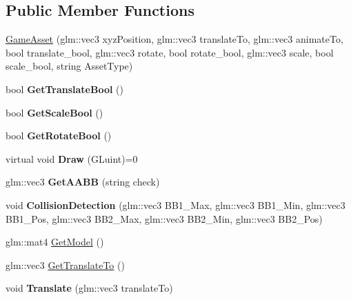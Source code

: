 \subsection*{Public Member Functions}
\begin{DoxyCompactItemize}
\item 
\hyperlink{class_game_asset_a9de932075d9b4263e7fb24fbfd163a61}{Game\+Asset} (glm\+::vec3 xyz\+Position, glm\+::vec3 translate\+To, glm\+::vec3 animate\+To, bool translate\+\_\+bool, glm\+::vec3 rotate, bool rotate\+\_\+bool, glm\+::vec3 scale, bool scale\+\_\+bool, string Asset\+Type)
\item 
\hypertarget{class_game_asset_af74bc1c4f6b87a4843217637b75290d4}{}bool {\bfseries Get\+Translate\+Bool} ()\label{class_game_asset_af74bc1c4f6b87a4843217637b75290d4}

\item 
\hypertarget{class_game_asset_ae0a76a50ff3c6c119852c195053c9a38}{}bool {\bfseries Get\+Scale\+Bool} ()\label{class_game_asset_ae0a76a50ff3c6c119852c195053c9a38}

\item 
\hypertarget{class_game_asset_a9fb9187dfca6160898344e79d41de224}{}bool {\bfseries Get\+Rotate\+Bool} ()\label{class_game_asset_a9fb9187dfca6160898344e79d41de224}

\item 
\hypertarget{class_game_asset_a961aa51ca0a9961fc584c0b5d5431300}{}virtual void {\bfseries Draw} (G\+Luint)=0\label{class_game_asset_a961aa51ca0a9961fc584c0b5d5431300}

\item 
\hypertarget{class_game_asset_a992a9c94083ee91bda85a4ec367c4fb3}{}glm\+::vec3 {\bfseries Get\+A\+A\+B\+B} (string check)\label{class_game_asset_a992a9c94083ee91bda85a4ec367c4fb3}

\item 
\hypertarget{class_game_asset_abd0491ffc6a601f8f3c47a2010f14039}{}void {\bfseries Collision\+Detection} (glm\+::vec3 B\+B1\+\_\+\+Max, glm\+::vec3 B\+B1\+\_\+\+Min, glm\+::vec3 B\+B1\+\_\+\+Pos, glm\+::vec3 B\+B2\+\_\+\+Max, glm\+::vec3 B\+B2\+\_\+\+Min, glm\+::vec3 B\+B2\+\_\+\+Pos)\label{class_game_asset_abd0491ffc6a601f8f3c47a2010f14039}

\item 
glm\+::mat4 \hyperlink{class_game_asset_a50a4795382fb55c7513314f82821e444}{Get\+Model} ()
\item 
glm\+::vec3 \hyperlink{class_game_asset_af19b5c6341758ee89c8dfb020eb678f6}{Get\+Translate\+To} ()
\item 
\hypertarget{class_game_asset_a5c0479920e4aa2fea7830a47c1a4e3f3}{}void {\bfseries Translate} (glm\+::vec3 translate\+To)\label{class_game_asset_a5c0479920e4aa2fea7830a47c1a4e3f3}

\end{DoxyCompactItemize}


